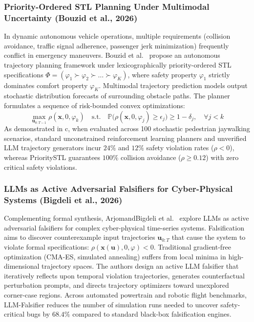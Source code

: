 \subsubsection{Priority-Ordered STL Planning Under Multimodal Uncertainty (Bouzid et al., 2026)}
In dynamic autonomous vehicle operations, multiple requirements (collision avoidance, traffic signal adherence, passenger jerk minimization) frequently conflict in emergency maneuvers. Bouzid et al.~\cite{Bouzid2026PrioritySTL} propose an autonomous trajectory planning framework under lexicographically priority-ordered STL specifications $\Phi = (\varphi_1 \succ \varphi_2 \succ \dots \succ \varphi_K)$, where safety property $\varphi_1$ strictly dominates comfort property $\varphi_K$. Multimodal trajectory prediction models output stochastic distribution forecasts of surrounding obstacle paths. The planner formulates a sequence of risk-bounded convex optimizations:
\begin{equation}
    \max_{\mathbf{u}_{0:T-1}} \rho(\mathbf{x}, 0, \varphi_k) \quad \text{s.t.} \quad \mathbb{P}\bigl(\rho(\mathbf{x}, 0, \varphi_j) \ge \epsilon_j\bigr) \ge 1 - \delta_j, \quad \forall j < k
\end{equation}
As demonstrated in c, when evaluated across 100 stochastic pedestrian jaywalking scenarios, standard unconstrained reinforcement learning planners and unverified LLM trajectory generators incur $24\%$ and $12\%$ safety violation rates ($\rho < 0$), whereas PrioritySTL guarantees $100\%$ collision avoidance ($\rho \ge 0.12$) with zero critical safety violations.

\subsubsection{LLMs as Active Adversarial Falsifiers for Cyber-Physical Systems (Bigdeli et al., 2026)}
Complementing formal synthesis, ArjomandBigdeli et al.~\cite{Bigdeli2026LLMFalsifier} explore LLMs as active adversarial falsifiers for complex cyber-physical time-series systems. Falsification aims to discover counterexample input trajectories $\mathbf{u}_{0:T}$ that cause the system to violate formal specifications: $\rho(\mathbf{x}(\mathbf{u}), 0, \varphi) < 0$. Traditional gradient-free optimization (CMA-ES, simulated annealing) suffers from local minima in high-dimensional trajectory spaces. The authors design an active LLM falsifier that iteratively reflects upon temporal violation trajectories, generates counterfactual perturbation prompts, and directs trajectory optimizers toward unexplored corner-case regions. Across automated powertrain and robotic flight benchmarks, LLM-Falsifier reduces the number of simulation runs needed to uncover safety-critical bugs by $68.4\%$ compared to standard black-box falsification engines.


